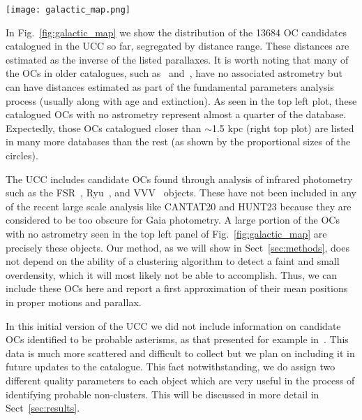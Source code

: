 \documentclass[fleqn,usenatbib]{mnras}
\begin{document}
\begin{figure*}
	\texttt{[image: galactic\_map.png]}
    \caption{Map of the full list of catalogued OCs in this work, in
    galactic coordinates, by range of catalogued distance. From top left
    to bottom right: OCs catalogued with no distance (grey), OCs with
    $d\leq1.5$ kpc (green), OCs in the range $1.5<d\leq3$ kpc (blue), and OCs
    with $d>3$ kpc (orange). Sizes are proportional to the number of
    databases from Table~\ref{tab:references} that include the candidate OC.}
    \label{fig:galactic_map}
\end{figure*}

In Fig.~\ref{fig:galactic_map} we show the distribution of the 13684 OC
candidates catalogued in the UCC so far, segregated by distance range. These
distances are estimated as the inverse of the listed parallaxes. It is worth
noting that many of the OCs in older catalogues, such
as~\cite{Kharchenko_2012} and~\cite{Bica_2019}, have
no associated astrometry but can have distances estimated as part of the
fundamental parameters analysis process (usually along with age and extinction).
As seen in the top left plot, these catalogued OCs with no astrometry represent
almost a quarter of the database.
Expectedly, those OCs catalogued closer than $\sim$1.5 kpc (right top plot) are
listed in many more databases than the rest (as shown by the proportional sizes
of the circles).

The UCC includes candidate OCs found through analysis of infrared
photometry such as the FSR~\citep{Froebrich_2007}, Ryu~\citep{Ryu_2018}, and
VVV~\citep{Barba_2015} objects. These have not been included in any of the
recent large scale analysis like CANTAT20 and HUNT23 because they are considered
to be too obscure for Gaia photometry. A large portion of the OCs with no
astrometry seen in the top left panel of Fig.~\ref{fig:galactic_map} are
precisely these objects.
Our method, as we will show in Sect~\ref{sec:methods}, does not depend on the
ability of a clustering algorithm to detect a faint and small overdensity, which
it will most likely not be able to accomplish. Thus, we can include these OCs
here and report a first approximation of their mean positions in proper motions
and parallax.

In this initial version of the UCC we did not include information on
candidate OCs identified to be probable asterisms, as that presented for example
in~\cite{Cantat-Anders_2020}. This data is much more scattered and difficult to
collect but we plan on including it in future updates to the catalogue. This
fact notwithstanding, we do assign two different quality parameters to each
object which are very useful in the process of identifying probable
non-clusters. This will be discussed in more detail in Sect~\ref{sec:results}.
\end{document}
